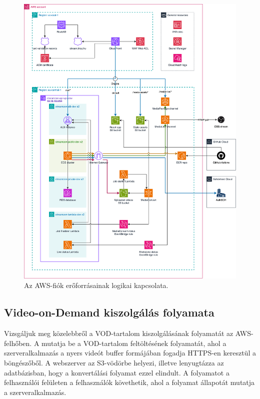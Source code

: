 \vspace{2cm} %

\begin{figure}[]
	\centering
	\includegraphics[width=160mm, keepaspectratio]{figures/dipterv_architect.png}
	\caption{Az AWS-fiók erőforrásainak logikai kapcsolata.}
	\label{fig:architect}
\end{figure}

\vspace{2cm} %

\subsection{Video-on-Demand kiszolgálás folyamata}

Vizsgáljuk meg közelebbről a VOD-tartalom kiszolgálásának folyamatát az AWS-felhőben. A  mutatja be a VOD-tartalom feltöltésének folyamatát, ahol a szerveralkalmazás a nyers videót buffer formájában fogadja HTTPS-en keresztül a böngészőből. A webszerver az S3-vödörbe helyezi, illetve lenyugtázza az adatbázisban, hogy a konvertálási folyamat ezzel elindult. A folyamatot a felhasználói felületen a felhasználók követhetik, ahol a folyamat állapotát mutatja a szerveralkalmazás.

